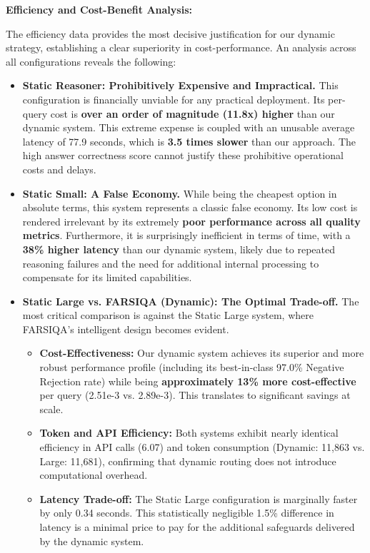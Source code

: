 \documentclass[11pt]{article}
\begin{document}
\textbf{Efficiency and Cost-Benefit Analysis:}

The efficiency data provides the most decisive justification for our dynamic strategy, establishing a clear superiority in cost-performance. An analysis across all configurations reveals the following:

\begin{itemize}
\item \textbf{Static Reasoner: Prohibitively Expensive and Impractical.} This configuration is financially unviable for any practical deployment. Its per-query cost is \textbf{over an order of magnitude (11.8x) higher} than our dynamic system. This extreme expense is coupled with an unusable average latency of 77.9 seconds, which is \textbf{3.5 times slower} than our approach. The high answer correctness score cannot justify these prohibitive operational costs and delays.

\item \textbf{Static Small: A False Economy.} While being the cheapest option in absolute terms, this system represents a classic false economy. Its low cost is rendered irrelevant by its extremely \textbf{poor performance across all quality metrics}. Furthermore, it is surprisingly inefficient in terms of time, with a \textbf{38\% higher latency} than our dynamic system, likely due to repeated reasoning failures and the need for additional internal processing to compensate for its limited capabilities.

\item \textbf{Static Large vs. FARSIQA (Dynamic): The Optimal Trade-off.} The most critical comparison is against the Static Large system, where FARSIQA's intelligent design becomes evident.
  \begin{itemize}
    \item \textbf{Cost-Effectiveness:} Our dynamic system achieves its superior and more robust performance profile (including its best-in-class 97.0\% Negative Rejection rate) while being \textbf{approximately 13\% more cost-effective} per query (2.51e-3 vs. 2.89e-3). This translates to significant savings at scale.
    \item \textbf{Token and API Efficiency:} Both systems exhibit nearly identical efficiency in API calls (6.07) and token consumption (Dynamic: 11,863 vs. Large: 11,681), confirming that dynamic routing does not introduce computational overhead.
    \item \textbf{Latency Trade-off:} The Static Large configuration is marginally faster by only 0.34 seconds. This statistically negligible 1.5\% difference in latency is a minimal price to pay for the additional safeguards delivered by the dynamic system.
  \end{itemize}
\end{itemize}
\end{document}
